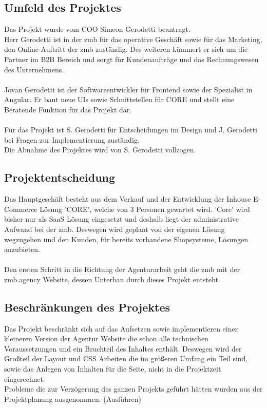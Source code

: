 \documentclass[11pt,a4paper]{article}
\begin{document}
\subsection{Umfeld des Projektes}
Das Projekt wurde vom COO Simeon Gerodetti beantragt.\\
Herr Gerodetti ist in der zmb für das operative Geschäft sowie für das Marketing, den Online-Auftritt der zmb zuständig.
Des weiteren kümmert er sich um die Partner im \acs{B2B} Bereich und sorgt für Kundenaufträge und das Rechnungswesen des Unternehmens.\\\\
Jovan Gerodetti ist der Softwareentwickler für Frontend sowie der Spezialist in Angular. Er baut neue UIs sowie Schnittstellen für CORE und stellt eine Beratende Funktion für das Projekt dar.\\\\
Für das Projekt ist S. Gerodetti für Entscheidungen im Design und J. Gerodetti bei Fragen zur Implementierung zuständig.\\
Die Abnahme des Projektes wird von S. Gerodetti vollzogen.
\subsection{Projektentscheidung}
Das Hauptgeschäft besteht aus dem Verkauf und der Entwicklung der Inhouse E-Commerce Lösung 'CORE', welche von 3 Personen gewartet wird. 'Core' wird bisher nur als SaaS Lösung eingesetzt und deshalb liegt der administrative Aufwand bei der zmb. Deswegen wird geplant von der eigenen Lösung wegzugehen und den Kunden, für bereits vorhandene Shopsysteme, Lösungen anzubieten.\\\\
Den ersten Schritt in die Richtung der Agenturarbeit geht die zmb mit der zmb.agency Website, dessen Unterbau durch dieses Projekt entsteht.
\subsection{Beschränkungen des Projektes}
Das Projekt beschränkt sich auf das Aufsetzen sowie implementieren einer kleineren Version der Agentur Website die schon alle technischen Voraussetzungen und ein Bruchteil des Inhaltes enthält. Deswegen wird der Großteil der Layout und CSS Arbeiten die im größeren Umfang ein Teil sind, sowie das Anlegen von Inhalten für die Seite, nicht in die Projektzeit eingerechnet.\\
Probleme die zur Verzögerung des ganzen Projekts geführt hätten wurden aus der Projektplanung ausgenommen. (Ausführen)
\end{document}

